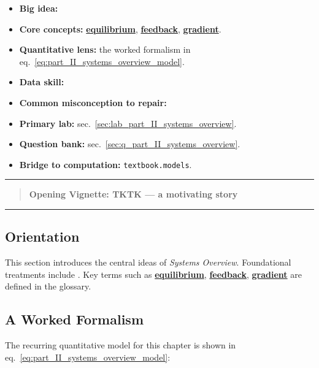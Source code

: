 \documentclass[
]{article}
\providecommand{\tightlist}{%
  \setlength{\itemsep}{0pt}\setlength{\parskip}{0pt}}
\theoremstyle{plain}
\theoremstyle{definition}
\begin{document}
\begin{itemize}
\tightlist
\item
  \textbf{Big idea:}
\item
  \textbf{Core concepts:}
  \hyperref[gl:equilibrium]{\textbf{equilibrium}},
  \hyperref[gl:feedback]{\textbf{feedback}},
  \hyperref[gl:gradient]{\textbf{gradient}}.
\item
  \textbf{Quantitative lens:} the worked formalism in
  eq.~\ref{eq:part_II_systems_overview_model}.
\item
  \textbf{Data skill:}
\item
  \textbf{Common misconception to repair:}
\item
  \textbf{Primary lab:} sec.~\ref{sec:lab_part_II_systems_overview}.
\item
  \textbf{Question bank:} sec.~\ref{sec:q_part_II_systems_overview}.
\item
  \textbf{Bridge to computation:} \texttt{textbook.models}.
\end{itemize}

\begin{center}\rule{0.5\linewidth}{0.5pt}\end{center}

\begin{quote}
\textbf{Opening Vignette: TKTK --- a motivating story}
\end{quote}

\begin{center}\rule{0.5\linewidth}{0.5pt}\end{center}

\subsection{Orientation}\label{orientation-5}

This section introduces the central ideas of \emph{Systems Overview}.
Foundational treatments include
\citep{patel2018models, nguyen2023synthesis}. Key terms such as
\hyperref[gl:equilibrium]{\textbf{equilibrium}},
\hyperref[gl:feedback]{\textbf{feedback}},
\hyperref[gl:gradient]{\textbf{gradient}} are defined in the glossary.

\subsection{A Worked Formalism}\label{a-worked-formalism-5}

The recurring quantitative model for this chapter is shown in
eq.~\ref{eq:part_II_systems_overview_model}:
\end{document}
